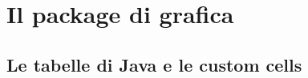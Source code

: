 \chapter{Il package di grafica}\label{chap:gui_package}
\section{Le tabelle di Java e le custom cells}